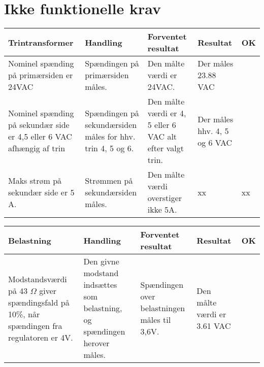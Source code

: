 \section{Ikke funktionelle krav}
\begin{table}[H]
	\centering
	\begin{tabular}{|p{4cm}|p{3cm}|p{3cm}|p{3cm}|p{1cm}|}
		\hline
		\textbf{Trintransformer} & \textbf{Handling} & \textbf{Forventet resultat} & \textbf{Resultat} &\textbf{OK} \\\hline
		Nominel spænding på primærsiden er 24VAC & Spændingen på primærsiden måles. & Den målte værdi er 24VAC. & Der måles 23.88 VAC & \checkmark \\\hline
		Nominel spænding på sekundær side er 4,5 eller 6 VAC afhængig af trin & Spændingen på sekundærsiden måles for hhv. trin 4, 5 og 6. & Den målte værdi er 4, 5 eller 6 VAC alt efter valgt trin. & Der måles hhv. 4, 5 og 6 VAC & \checkmark \\\hline
		Maks strøm på sekundær side er 5 A. & Strømmen på sekundærsiden måles. & Den målte værdi overstiger ikke 5A. & xx  & xx \\\hline
	\end{tabular}
	
\end{table}

\begin{table}[H]
	\centering
	\begin{tabular}{|p{4cm}|p{3cm}|p{3cm}|p{3cm}|p{1cm}|}
		\hline
		\textbf{Belastning} & \textbf{Handling} & \textbf{Forventet resultat} & \textbf{Resultat} &\textbf{OK} \\\hline
		Modstandsværdi på 43 $\Omega$ giver spændingsfald på 10\%, når spændingen fra regulatoren er 4V. & Den givne modstand indsættes som belastning, og spændingen herover måles. & Spændingen over belastningen måles til 3,6V. & Den målte værdi er 3.61 VAC & \checkmark \\\hline	
	\end{tabular}

	
\end{table}

